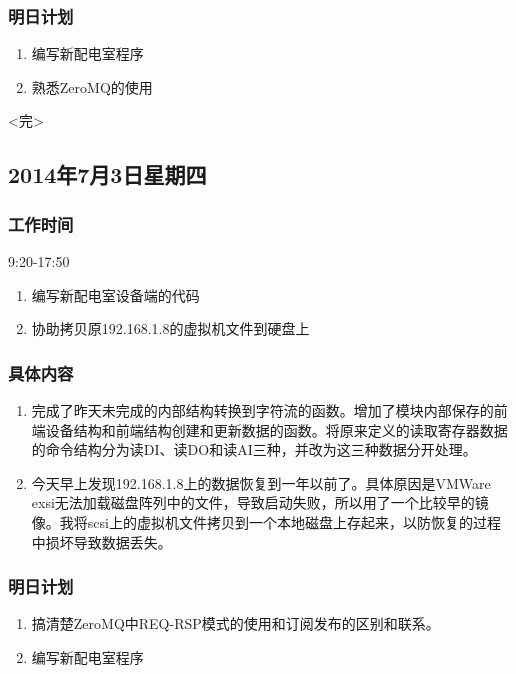 \documentclass[11pt]{article}
\begin{document}
\subsubsection{明日计划}
  \begin{enumerate}
  \item 编写新配电室程序
  \item 熟悉ZeroMQ的使用
  \end{enumerate}

\begin{center}
  <完>
\end{center}


\newpage

\subsection{2014年7月3日星期四}
\subsubsection{工作时间}

  9:20-17:50

  \begin{enumerate}
  \item 编写新配电室设备端的代码
  \item 协助拷贝原192.168.1.8的虚拟机文件到硬盘上
  \end{enumerate}
  
\subsubsection{具体内容}
  \begin{enumerate}
  \item 完成了昨天未完成的内部结构转换到字符流的函数。增加了模块内部保存的前端设备结构和前端结构创建和更新数据的函数。将原来定义的读取寄存器数据的命令结构分为读DI、读DO和读AI三种，并改为这三种数据分开处理。
  \item 今天早上发现192.168.1.8上的数据恢复到一年以前了。具体原因是VMWare exsi无法加载磁盘阵列中的文件，导致启动失败，所以用了一个比较早的镜像。我将scsi上的虚拟机文件拷贝到一个本地磁盘上存起来，以防恢复的过程中损坏导致数据丢失。
  \end{enumerate}
  
\subsubsection{明日计划}
  \begin{enumerate}
  \item 搞清楚ZeroMQ中REQ-RSP模式的使用和订阅发布的区别和联系。
  \item 编写新配电室程序
  \end{enumerate}
\end{document}
